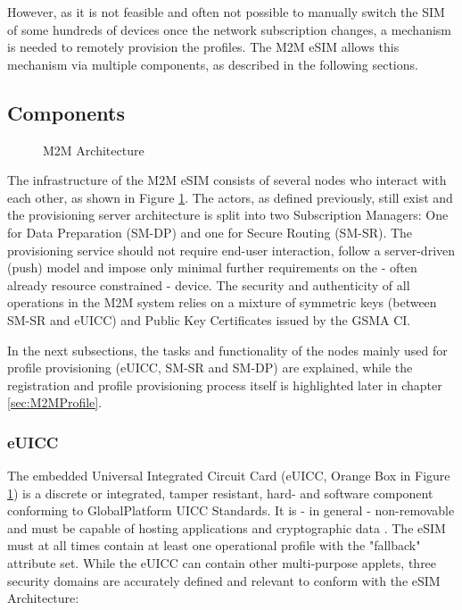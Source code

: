 However, as it is not feasible and often not possible to manually switch the SIM of some hundreds of devices once the network subscription changes, a mechanism is needed to remotely provision the profiles. The M2M eSIM allows this mechanism via multiple components, as described in the following sections. 

\subsection{Components}
\begin{figure}[ht]
    \centering
    
    \caption{M2M Architecture}
    \label{fig:m2m_arch}
\end{figure}
The infrastructure of the M2M eSIM consists of several nodes who interact with each other, as shown in Figure \ref{fig:m2m_arch}. The actors, as defined previously, still exist and the provisioning server architecture is split into two Subscription Managers: One for Data Preparation (SM-DP) and one for Secure Routing (SM-SR). The provisioning service should not require end-user interaction, follow a server-driven (push) model and impose only minimal further requirements on the - often already resource constrained - device. The security and authenticity of all operations in the M2M system relies on a mixture of symmetric keys (between SM-SR and eUICC) and Public Key Certificates issued by the GSMA CI.

In the next subsections, the tasks and functionality of the nodes mainly used for profile provisioning (eUICC, SM-SR and SM-DP) are explained, while the registration and profile provisioning process itself is highlighted later in chapter \ref{sec:M2MProfile}.

\subsubsection{eUICC}
The embedded Universal Integrated Circuit Card (\acrshort{eUICC}, Orange Box in Figure \ref{fig:m2m_arch}) is a discrete or integrated, tamper resistant, hard- and software component conforming to GlobalPlatform UICC Standards. It is - in general - non-removable and must be capable of hosting applications and cryptographic data \parencite{SGP:01}. The eSIM must at all times contain at least one operational profile with the "fallback" attribute set. While the eUICC can contain other multi-purpose applets, three security domains are accurately defined and relevant to conform with the eSIM Architecture:


